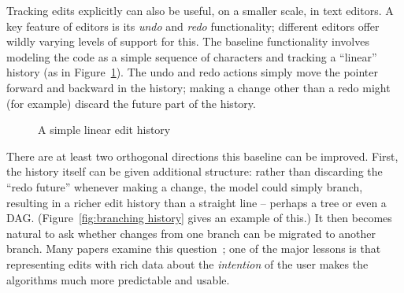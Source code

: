 \documentclass{article}
\newif\ifhighlightnew\highlightnewfalse
\newenvironment{newcontent}{\ifhighlightnew\color{green!55!black}[new]\fi}{\ifhighlightnew\color{black}\fi}
\begin{document}
\begin{newcontent}
Tracking edits explicitly can also be useful, on a smaller scale, in text
editors. A key feature of editors is its \emph{undo} and \emph{redo}
functionality; different editors offer wildly varying levels of support for
this. The baseline functionality involves modeling the code as a simple
sequence of characters and tracking a ``linear'' history (as in
Figure~\ref{fig:linear history}). The undo and redo actions simply move the
pointer forward and backward in the history; making a change other than a
redo might (for example) discard the future part of the history.

\begin{figure}
    \begin{center}
    \end{center}
    \caption{A simple linear edit history}
    \label{fig:linear history}
\end{figure}

There are at least two orthogonal directions this baseline can be improved.
First, the history itself can be given additional structure: rather than
discarding the ``redo future'' whenever making a change, the model could
simply branch, resulting in a richer edit history than a straight line --
perhaps a tree or even a DAG. (Figure~\ref{fig:branching history} gives an
example of this.) It then becomes natural to ask whether changes from one
branch can be migrated to another branch. Many papers examine this
question~\cite{abowd1992giving,berlage1994selective,cass2007using,dix95moving,kurlander1990visual};
one of the major lessons is that representing edits with rich data about the
\emph{intention} of the user makes the algorithms much more predictable and
usable.


\end{newcontent}
\end{document}
